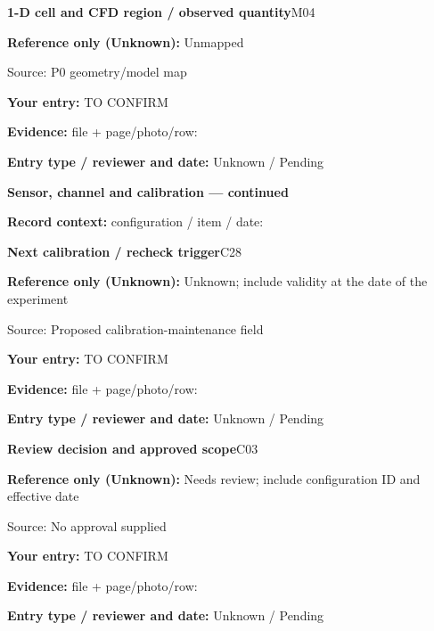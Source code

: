 \documentclass[11pt]{article}
\begin{document}
\begin{minipage}{\textwidth}\small
{\color{navy}\bfseries 1-D cell and CFD region / observed quantity}\hfill M04\par
\colorbox{pale}{\parbox{\dimexpr\linewidth-2\fboxsep\relax}{
\textbf{Reference only (Unknown):} Unmapped\par
{\footnotesize Source: P0 geometry/model map}}}\par
\textbf{Your entry:} {\color{muted}TO CONFIRM}\enspace\hrulefill\par
{\footnotesize\textbf{Evidence:} file + page/photo/row: \hrulefill\par
\textbf{Entry type / reviewer and date:} Unknown / Pending\par
}\end{minipage}\par\vspace{5pt}
\clearpage
{\large\bfseries Sensor, channel and calibration --- continued}\par
\textbf{Record context:} configuration / item / date: \hrulefill\par
\begin{minipage}{\textwidth}\small
{\color{navy}\bfseries Next calibration / recheck trigger}\hfill C28\par
\colorbox{pale}{\parbox{\dimexpr\linewidth-2\fboxsep\relax}{
\textbf{Reference only (Unknown):} Unknown; include validity at the date of the experiment\par
{\footnotesize Source: Proposed calibration-maintenance field}}}\par
\textbf{Your entry:} {\color{muted}TO CONFIRM}\enspace\hrulefill\par
{\footnotesize\textbf{Evidence:} file + page/photo/row: \hrulefill\par
\textbf{Entry type / reviewer and date:} Unknown / Pending\par
}\end{minipage}\par\vspace{5pt}
\begin{minipage}{\textwidth}\small
{\color{navy}\bfseries Review decision and approved scope}\hfill C03\par
\colorbox{pale}{\parbox{\dimexpr\linewidth-2\fboxsep\relax}{
\textbf{Reference only (Unknown):} Needs review; include configuration ID and effective date\par
{\footnotesize Source: No approval supplied}}}\par
\textbf{Your entry:} {\color{muted}TO CONFIRM}\enspace\hrulefill\par
{\footnotesize\textbf{Evidence:} file + page/photo/row: \hrulefill\par
\textbf{Entry type / reviewer and date:} Unknown / Pending\par
}\end{minipage}\par\vspace{5pt}
\end{document}
